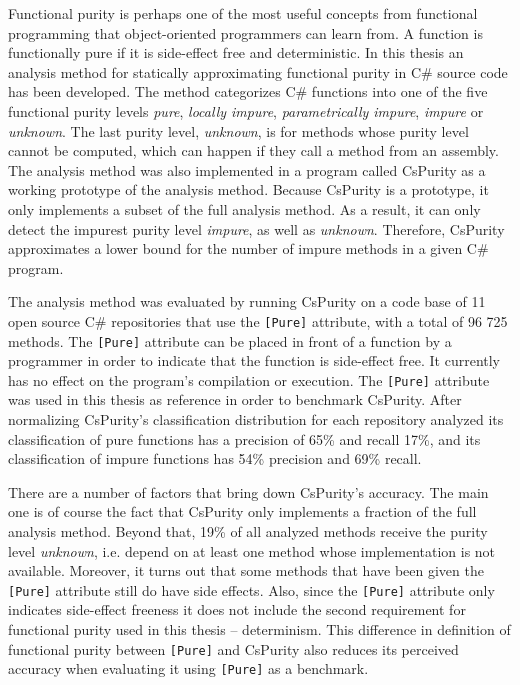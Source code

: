 \documentclass[a4paper,12pt]{article}
\begin{document}
Functional purity is perhaps one of the most useful concepts from functional programming that object-oriented programmers can learn from. A function is functionally pure if it is side-effect free and deterministic. In this thesis an analysis method for statically approximating functional purity in C\# source code has been developed. The method categorizes C\# functions into one of the five functional purity levels \textit{pure}, \textit{locally impure}, \textit{parametrically impure}, \textit{impure} or \textit{unknown}. The last purity level, \textit{unknown}, is for methods whose purity level cannot be computed, which can happen if they call a method from an assembly. The analysis method was also implemented in a program called CsPurity as a working prototype of the analysis method. Because CsPurity is a prototype, it only implements a subset of the full analysis method. As a result, it can only detect the impurest purity level \textit{impure}, as well as \textit{unknown}. Therefore, CsPurity approximates a lower bound for the number of impure methods in a given C\# program.

The analysis method was evaluated by running CsPurity on a code base of 11 open source C\# repositories that use the \texttt{[Pure]} attribute, with a total of 96 725 methods. The \texttt{[Pure]} attribute can be placed in front of a function by a programmer in order to indicate that the function is side-effect free. It currently has no effect on the program's compilation or execution. The \texttt{[Pure]} attribute was used in this thesis as reference in order to benchmark CsPurity. After normalizing CsPurity's classification distribution for each repository analyzed its classification of pure functions has a precision of 65\% and recall 17\%, and its classification of impure functions has 54\% precision and 69\% recall.

There are a number of factors that bring down CsPurity's accuracy. The main one is of course the fact that CsPurity only implements a fraction of the full analysis method. Beyond that, 19\% of all analyzed methods receive the purity level \textit{unknown}, i.e. depend on at least one method whose implementation is not available. Moreover, it turns out that some methods that have been given the \texttt{[Pure]} attribute still do have side effects. Also, since the \texttt{[Pure]} attribute only indicates side-effect freeness it does not include the second requirement for functional purity used in this thesis -- determinism. This difference in definition of functional purity between \texttt{[Pure]} and CsPurity also reduces its perceived accuracy when evaluating it using \texttt{[Pure]} as a benchmark.
\end{document}
